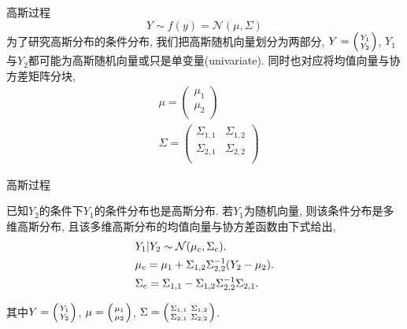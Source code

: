 \begin{frame}[fragile]{高斯过程}
    $$Y \sim f(y)=\mathcal{N}(\mu, \Sigma)$$
    为了研究高斯分布的条件分布, 我们把高斯随机向量划分为两部分, $Y=\left( {Y_{1}\atop Y_{2}}\right)$, $Y_{1}$与$Y_{2}$都可能为高斯随机向量或只是单变量(univariate). 同时也对应将均值向量与协方差矩阵分块,
    \begin{align}
        &\mu=   \begin{pmatrix}
                        \mu_{1} \\ \mu_{2} \\
                \end{pmatrix}  \\
        &\Sigma=\begin{pmatrix}\label{2.13}
                    \Sigma_{1,1} & \Sigma_{1,2} \\
                    \Sigma_{2,1} & \Sigma_{2,2} \\
                \end{pmatrix}
    \end{align}
\end{frame}

\begin{frame}[fragile]{高斯过程}
    \begin{property}
        已知$Y_{2}$的条件下$Y_{1}$的条件分布也是高斯分布. 若$Y_{1}$为随机向量, 则该条件分布是多维高斯分布, 且该多维高斯分布的均值向量与协方差函数由下式给出,
        \begin{align}
            &Y_{1}|Y_{2}\sim\mathcal{N}(\mu_{c}, \Sigma_{c}). \notag \\
            &\mu_{c}=\mu_{1}+\Sigma_{1,2}\Sigma_{2,2}^{-1}(Y_{2}-\mu_{2}). \\
            &\Sigma_{c}=\Sigma_{1,1}-\Sigma_{1,2}\Sigma^{-1}_{2,2}\Sigma_{2,1}.
        \end{align}
    \end{property}

    其中$Y=\left( {Y_{1}\atop Y_{2}}\right)$, $\mu=\left( {\mu_{1}\atop \mu_{2}}\right)$, $\Sigma=\left({\Sigma_{1,1} \ \Sigma_{1,2}\atop   \Sigma_{2,1} \ \Sigma_{2,2}} \right)$.
\end{frame}


